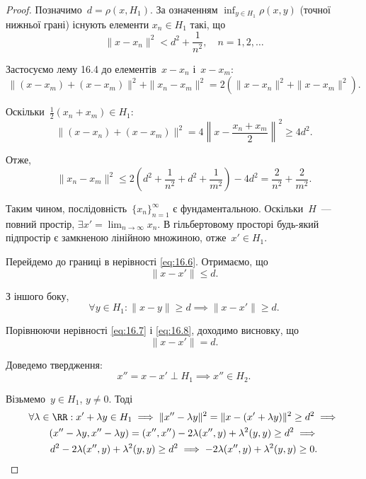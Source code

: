 \begin{proof}
Позначимо~$d = \rho(x, H_1)$. За означенням
$\inf_{y \in H_1} \rho(x, y)$ (точної нижньої грані) існують елементи
$x_n \in H_1$ такі, що
\begin{equation}
    \label{eq:16.6}
    \|x - x_n\|^2 < d^2 + \frac{1}{n^2}, \quad n = 1, 2, \dots
\end{equation}

Застосуємо лему 16.4 до елементів~$x - x_n$ і~$x - x_m$:
\begin{equation*}
    \|(x - x_m) + (x - x_m)\|^2 + \|x_n - x_m\|^2 =
    2 (\|x - x_n\|^2 + \|x - x_m\|^2).
\end{equation*}

Оскільки~$\frac{1}{2}(x_n + x_m) \in H_1$:
\begin{equation*}
    \|(x - x_n) + (x - x_m)\|^2 =
    4 \left\| x - \frac{x_n + x_m}{2} \right\|^2 \ge
    4 d^2.
\end{equation*}

Отже,
\begin{equation*}
    \|x_n - x_m\|^2 \le
    2 \left(d^2 + \frac{1}{n^2} + d^2 + \frac{1}{m^2} \right) - 4 d^2 =
    \frac{2}{n^2} + \frac{2}{m^2}.
\end{equation*}

Таким чином, послідовність~$\{x_n\}_{n = 1}^\infty$ є фундаментальною.
Оскільки~$H$~--- повний простір, $\exists x' = \lim_{n \to \infty} x_n$.
В гільбертовому просторі будь-який підпростір є замкненою
лінійною множиною, отже~$x' \in H_1$.

Перейдемо до границі в нерівності \eqref{eq:16.6}. Отримаємо, що
\begin{equation}
    \label{eq:16.7}
    \|x - x'\| \le d.
\end{equation}

З іншого боку,
\begin{equation}
    \label{eq:16.8}
    \forall y \in H_1: \|x - y\| \ge d \implies \|x - x'\| \ge d.
\end{equation}

Порівнюючи нерівності \eqref{eq:16.7} і \eqref{eq:16.8}, доходимо висновку, що
\begin{equation*}
    \|x - x'\| = d.
\end{equation*}

Доведемо твердження:
\begin{equation*}
    x'' = x - x' \perp H_1 \implies x'' \in H_2.
\end{equation*}

Візьмемо~$y \in H_1$, $y \ne 0$. Тоді
\begin{multline*}
    \forall \lambda \in \RR:
    x' + \lambda y \in H_1 \implies
    \|x'' - \lambda y\|^2 = \|x - (x' + \lambda y)\|^2 \ge d^2 \implies \\
    (x'' - \lambda y, x'' - \lambda y) = (x'', x'') - 2 \lambda (x'', y) + \lambda^2 (y, y) \ge d^2 \implies \\
    d^2 - 2 \lambda (x'', y) + \lambda^2 (y, y) \ge d^2 \implies
    - 2 \lambda (x'', y) + \lambda^2 (y, y) \ge 0.
\end{multline*}


\end{proof}
